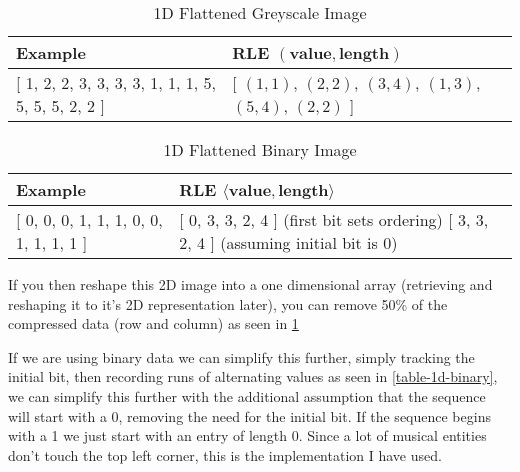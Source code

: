 \begin{table}[H]
    \begin{tabularx}{\textwidth}{ X | X }
        \toprule
        Example & RLE $(\textbf{value}, \textbf{length})$\\
        \midrule

        {[} 1, 2, 2, 3, 3, 3, 3, 1, 1, 1, 5, 5, 5, 5, 2, 2 {]}
        &
        {[} $(1, 1)$,
        $(2, 2)$,
        $(3, 4)$,
        $(1, 3)$,
        $(5, 4)$,
        $(2, 2)$ {]} \\
    \bottomrule
    \end{tabularx}

    \caption{1D Flattened Greyscale Image}
    \label{table:rle-1d}
\end{table}

\begin{table}[H]
    \begin{tabularx}{\textwidth}{ X | X }
        \toprule
        Example & RLE $\langle \textbf{value}, \textbf{length} \rangle$\\
        \midrule

        {[} 0, 0, 0, 1, 1, 1, 0, 0, 1, 1, 1, 1 {]}
        &
        {[} 0, 3, 3, 2, 4 {]} (first bit sets ordering)\newline
        {[} 3, 3, 2, 4 {]} (assuming initial bit is 0) \\
    \bottomrule
    \end{tabularx}

    \caption{1D Flattened Binary Image}
    \label{table:rle-1d-binary}
\end{table}

If you then reshape this 2D image into a one dimensional array (retrieving and reshaping it to it's 2D representation later), you can remove 50\% of the compressed data (row and column) as seen in \cref{table:rle-1d}

If we are using binary data we can simplify this further, simply tracking the initial bit, then recording runs of alternating values as seen in \cref{table-1d-binary}, we can simplify this further with the additional assumption \parencite{fujinaga1996adaptive} that the sequence will start with a 0, removing the need for the initial bit. If the sequence begins with a 1 we just start with an entry of length 0. Since a lot of musical entities don't touch the top left corner, this is the implementation I have used.
